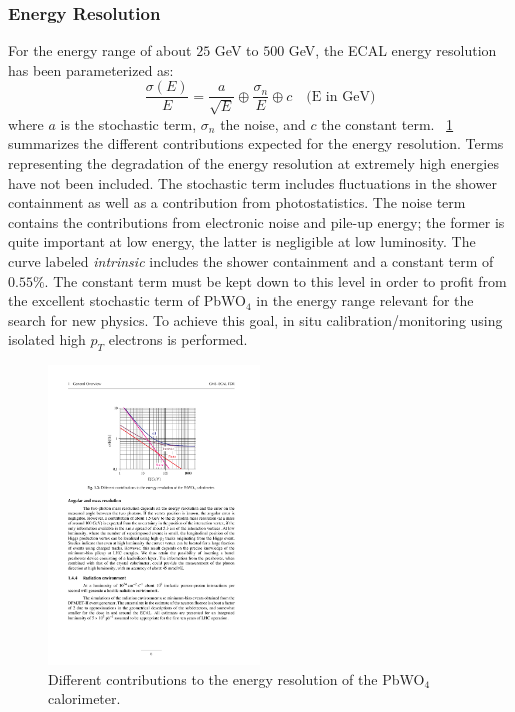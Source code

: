 \subsubsection{Energy Resolution}
For the energy range of about $25$ GeV  to $500$ GeV, the ECAL energy resolution has been parameterized as: 
\begin{equation}
 \frac{\sigma(E)}{E} =  \frac{a}{\sqrt{E}} \oplus \frac{\sigma_n}{E} \oplus c \quad \text{(E in GeV)}
\end{equation}
where $a$ is the stochastic term, $\sigma_n$ the noise, and $c$ the constant term. \figurename~\ref{Ecal_Resolution} summarizes the different contributions expected for the energy resolution. Terms representing the degradation of the energy resolution at extremely high energies have not been included. The stochastic term includes fluctuations in the shower containment as well as a contribution from photostatistics.  The noise term contains the contributions from electronic noise and pile-up energy; the former is quite important at low energy, the latter is negligible at low luminosity. The curve labeled \textit{intrinsic} includes the shower containment and a constant term of $0.55\%$. The constant term must be kept down to this level in order to profit from the excellent stochastic term of PbWO$_4$ in the energy range relevant for the search for new physics. To achieve this goal, in situ calibration/monitoring using isolated high $p_T$ electrons is performed.  
\begin{figure}[h!]
 \centering
 \includegraphics[width=0.5\textwidth]{Images/Ecal_Resolution.pdf}
 \caption[Resolution of the PbWO$_4$ calorimeter]{Different contributions to the energy resolution of the PbWO$_4$ calorimeter.}
\label{Ecal_Resolution}
\end{figure}

